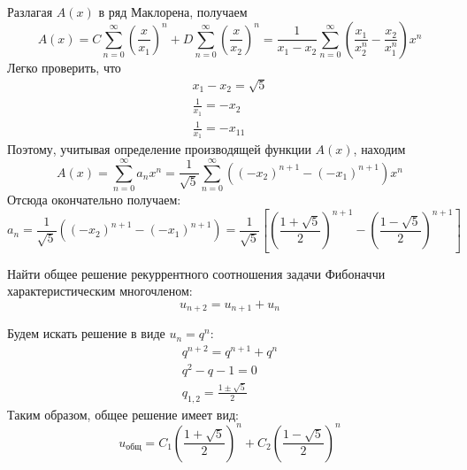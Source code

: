 \begin{task}
\begin{solution}
\begin{equation*}
        \end{equation*}
        Разлагая $A(x)$ в ряд Маклорена, получаем
        \begin{equation*}
            A(x) = C\sum_{n = 0}^{\infty} \left(\frac{x}{x_1}\right)^n + D\sum_{n = 0}^{\infty}\left(\frac{x}{x_2}\right)^n = 
            \frac{1}{x_1 - x_2} \sum_{n = 0}^{\infty}\left(\frac{x_1}{x_2^n} - \frac{x_2}{x_1^n}\right)x^n
        \end{equation*}
        Легко проверить, что 
        \begin{gather*}
            x_1 - x_2 = \sqrt{5} \\
            \frac{1}{x_1} = -x_2 \\
            \frac{1}{x_1} = -x_11
        \end{gather*}
        Поэтому, учитывая определение производящей функции $A(x)$, находим
        \begin{equation*}
            A(x) = \sum_{n = 0}^{\infty} a_n x^n = \frac{1}{\sqrt{5}}\sum_{n = 0}^{\infty}\left((-x_2)^{n+1} - (-x_1)^{n+1}\right)x^n
        \end{equation*}
        Отсюда окончательно получаем:
        \begin{equation*}
            a_n = \frac{1}{\sqrt{5}}\left((-x_2)^{n+1} - (-x_1)^{n+1}\right) = 
            \frac{1}{\sqrt{5}}\left[{\left(\frac{1+\sqrt{5}}{2}\right)}^{n+1} - {\left(\frac{1-\sqrt{5}}{2}\right)}^{n+1}\right]
        \end{equation*}
    \end{solution}
\end{task}

\begin{task}
    Найти общее решение рекуррентного соотношения задачи Фибоначчи 
    характеристическим многочленом:
    \begin{equation*}
        u_{n+2} = u_{n+1} + u_n
    \end{equation*}
    \begin{solution}
        Будем искать решение в виде $u_n = q^n$:
        \begin{gather*}
            q^{n+2} = q^{n+1} + q^n \\
            q^2 - q - 1 = 0 \\
            q_{1, 2} = \frac{1 \pm \sqrt{5}}{2}
        \end{gather*}
        Таким образом, общее решение имеет вид:
        \begin{equation}
            u_{\text{общ}} = C_1 \left(\frac{1 + \sqrt{5}}{2}\right) ^ n + C_2\left(\frac{1 - \sqrt{5}}{2}\right) ^ n
        \end{equation}
    \end{solution}
\end{task}

